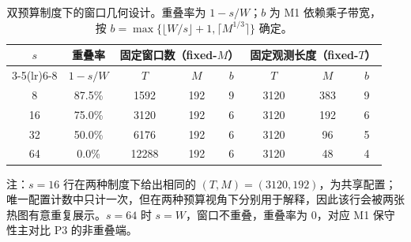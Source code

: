 \begin{table}[ht]
\centering
\caption{双预算制度下的窗口几何设计。重叠率为 $1-s/W$；$b$ 为 M1 依赖乘子带宽，按 $b=\max\{\lfloor W/s\rfloor+1,\lceil M^{1/3}\rceil\}$ 确定。}\label{tab:design}
\begin{tabular}{cccccccc}
\toprule
$s$ & 重叠率 & \multicolumn{3}{c}{固定窗口数（fixed-$M$）} & \multicolumn{3}{c}{固定观测长度（fixed-$T$）}\\
\cmidrule(lr){3-5}\cmidrule(lr){6-8}
 & $1-s/W$ & $T$ & $M$ & $b$ & $T$ & $M$ & $b$\\
\midrule
8 & 87.5\% & 1592 & 192 & 9 & 3120 & 383 & 9 \\
16 & 75.0\% & 3120 & 192 & 6 & 3120 & 192 & 6 \\
32 & 50.0\% & 6176 & 192 & 6 & 3120 & 96 & 5 \\
64 & 0.0\% & 12288 & 192 & 6 & 3120 & 48 & 4 \\
\bottomrule
\end{tabular}

\begin{minipage}{0.94\textwidth}
\vspace{0.4em}
\footnotesize 注：$s=16$ 行在两种制度下给出相同的 $(T,M)=(3120,192)$，为共享配置；唯一配置计数中只计一次，但在两种预算视角下分别用于解释，因此该行会被两张热图有意重复展示。$s=64$ 时 $s=W$，窗口不重叠，重叠率为 0，对应 M1 保守性主对比 P3 的非重叠端。
\end{minipage}
\end{table}
